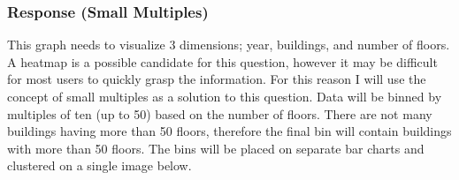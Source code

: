 \documentclass[11pt]{article}
\begin{document}
    \subsubsection{Response (Small
Multiples)}\label{response-small-multiples}

This graph needs to visualize 3 dimensions; year, buildings, and number
of floors. A heatmap is a possible candidate for this question, however
it may be difficult for most users to quickly grasp the information. For
this reason I will use the concept of small multiples as a solution to
this question. Data will be binned by multiples of ten (up to 50) based
on the number of floors. There are not many buildings having more than
50 floors, therefore the final bin will contain buildings with more than
50 floors. The bins will be placed on separate bar charts and clustered
on a single image below.
\end{document}
